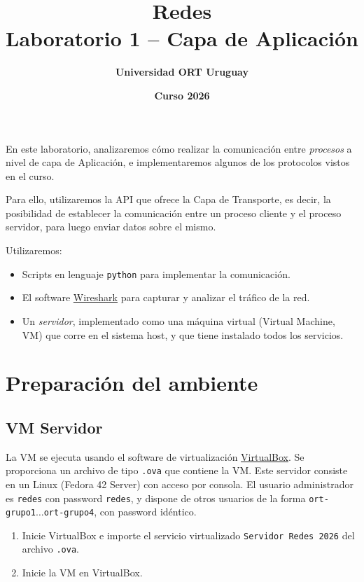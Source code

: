 \documentclass[a4paper,10pt]{article}
\title{\bf Redes \\Laboratorio 1 -- Capa de Aplicación}
\author{\bf Universidad ORT Uruguay}
\date{\bf Curso 2026}
\begin{document}
\maketitle
\thispagestyle{fancy}

En este laboratorio, analizaremos cómo realizar la comunicación entre \emph{procesos} a nivel de capa de Aplicación, e implementaremos algunos de los protocolos vistos en el curso. 

Para ello, utilizaremos la API que ofrece la Capa de Transporte, es decir, la posibilidad de establecer la comunicación entre un proceso cliente y el proceso servidor, para luego enviar datos sobre el mismo.

Utilizaremos:
\begin{itemize}
    \item Scripts en lenguaje \texttt{python} para implementar la comunicación.
    \item El software \href{http://wireshark.org}{Wireshark} para capturar y analizar el tráfico de la red.
    \item Un \emph{servidor}, implementado como una máquina virtual (Virtual Machine, VM) que corre en el sistema host, y que tiene instalado todos los servicios. 
\end{itemize}

\section*{Preparación del ambiente}

\subsection*{VM Servidor}

La VM se ejecuta usando el software de virtualización \href{https://www.virtualbox.org/}{VirtualBox}. Se proporciona un archivo de tipo \texttt{.ova} que contiene la VM. Este servidor consiste en un Linux (Fedora 42 Server) con acceso por consola. El usuario administrador es \texttt{redes} con password \texttt{redes}, y dispone de otros usuarios de la forma \texttt{ort-grupo1}$\ldots$\texttt{ort-grupo4}, con password idéntico.

\begin{enumerate}
    \item Inicie VirtualBox e importe el servicio virtualizado \texttt{Servidor Redes 2026} del archivo \texttt{.ova}.
    \item Inicie la VM en VirtualBox.
\end{enumerate}
\end{document}
